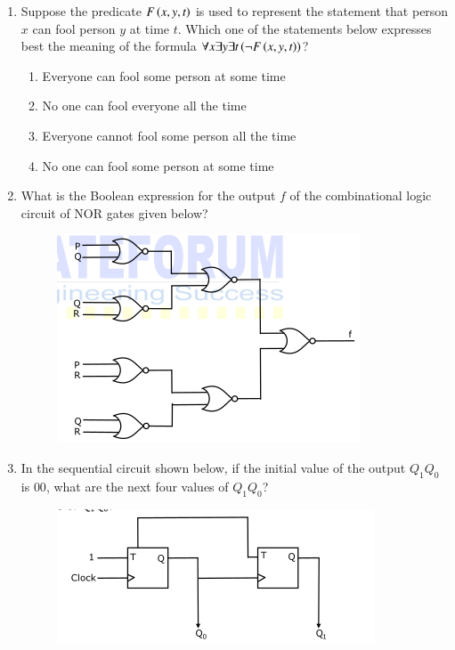 \documentclass[journal,12pt,onecolumn]{IEEEtran}
\theoremstyle{remark}
\begin{document}
\begin{enumerate}
		\item Suppose the predicate $F\left(x, y, t\right)$ is used to represent the statement that person $x$ can fool person $y$ at time $t$. Which one of the statements below expresses best the meaning of the formula $\forall x \exists y \exists t \left(\neg F\left(x, y, t\right)\right)$?
		
		\hfill{}
		
		\begin{enumerate}
			\item Everyone can fool some person at some time
			\item No one can fool everyone all the time
			\item Everyone cannot fool some person all the time
			\item No one can fool some person at some time
		\end{enumerate}
		
		\item What is the Boolean expression for the output $f$ of the combinational logic circuit of NOR gates given below?
\begin{figure}[H]
	\centering
	\includegraphics[width=0.3\linewidth]{figs/screenshot002}
	\caption{}
	\label{fig:screenshot002}
\end{figure}

		
		\hfill{}
		
		\begin{enumerate}
		\end{enumerate}
		
		\item In the sequential circuit shown below, if the initial value of the output $Q_1Q_0$ is $00$, what are the next four values of $Q_1Q_0$?
\begin{figure}[H]
	\centering
	\includegraphics[width=0.3\linewidth]{figs/screenshot003}
	\caption{}
	\label{fig:screenshot003}
\end{figure}


\end{enumerate}
\end{document}
